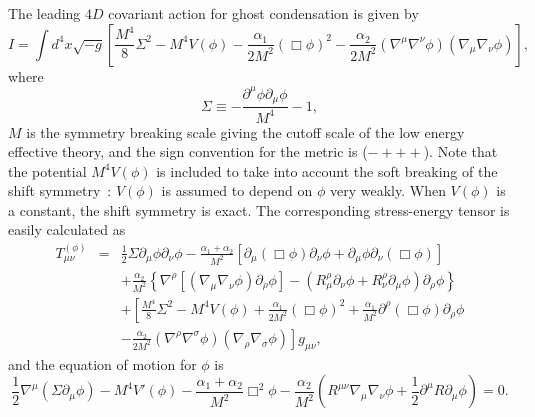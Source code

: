 The leading $4D$ covariant action for ghost condensation is given
by
%
\begin{equation}
 I = \int d^4x\sqrt{-g}
  \left[ \frac{M^4}{8}\Sigma^2 - M^4V(\phi)
			- \frac{\alpha_1}{2M^2}(\Box\phi)^2
			- \frac{\alpha_2}{2M^2}
			(\nabla^{\mu}\nabla^{\nu}\phi)
			(\nabla_{\mu}\nabla_{\nu}\phi)
	 \right],
  \label{eqn:4Daction}
\end{equation}
where 
%
\begin{equation}
 \Sigma \equiv -\frac{\partial^{\mu}\phi\partial_{\mu}\phi}{M^4} - 1,
\end{equation}
$M$ is the symmetry breaking scale giving the cutoff scale of the low
energy effective theory, and the sign convention for the metric is
($-+++$). Note that the potential $M^4V(\phi)$ is included to take into
account the soft breaking of the shift
symmetry~\cite{Creminelli:2006xe}: $V(\phi)$ is assumed to 
depend on $\phi$ very weakly. When $V(\phi)$ is a constant, the shift
symmetry is exact. The corresponding stress-energy tensor is easily
calculated as 
%
\begin{eqnarray}
 T^{(\phi)}_{\mu\nu} & = &
  \frac{1}{2}\Sigma\partial_{\mu}\phi\partial_{\nu}\phi 
  - \frac{\alpha_1+\alpha_2}{M^2}
  \left[\partial_{\mu}(\Box\phi)\partial_{\nu}\phi
   + \partial_{\mu}\phi\partial_{\nu}(\Box\phi)\right] \nonumber\\
 & &
  + \frac{\alpha_2}{M^2}
  \left\{
  \nabla^{\rho}
  \left[ (\nabla_{\mu}\nabla_{\nu}\phi)\partial_{\rho}\phi\right]
  - (R_{\mu}^{\rho}\partial_{\nu}\phi+R_{\nu}^{\rho}\partial_{\mu}\phi)
  \partial_{\rho}\phi \right\}  \nonumber\\
 & & + \left[ \frac{M^4}{8}\Sigma^2 - M^4V(\phi)
     +\frac{\alpha_1}{2M^2}(\Box\phi)^2
     +\frac{\alpha_1}{M^2}\partial^{\rho}(\Box\phi)\partial_{\rho}\phi
     \right.\nonumber\\
 & & \left.
     -\frac{\alpha_2}{2M^2}(\nabla^{\rho}\nabla^{\sigma}\phi)
     (\nabla_{\rho}\nabla_{\sigma}\phi)\right]g_{\mu\nu},
\end{eqnarray}
and the equation of motion for $\phi$ is 
%
\begin{equation}
 \frac{1}{2}\nabla^{\mu}(\Sigma\partial_{\mu}\phi) - M^4V'(\phi)
  - \frac{\alpha_1+\alpha_2}{M^2}\Box^2\phi 
  - \frac{\alpha_2}{M^2}
  \left(R^{\mu\nu}\nabla_{\mu}\nabla_{\nu}\phi
   +\frac{1}{2}\partial^{\mu}R\partial_{\mu}\phi \right)
  = 0. \label{eqn:EOM-phi}
\end{equation}
